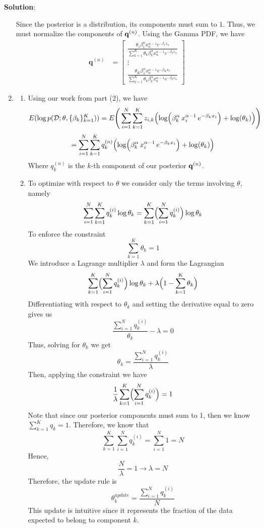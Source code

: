 \documentclass[submit]{../harvardml}
\newenvironment{solution}{
    \vspace{2mm}
    \color{blue}\noindent\textbf{Solution}:
}{}
\begin{document}
\begin{solution}
\begin{enumerate}
    Since the posterior is a distribution, its components must sum to $1$. Thus, we must normalize the components of $\bold q^{(n)}$. Using the Gamma PDF, we have
    \begin{align*}
      \textbf{q}^{(n)} &= \begin{bmatrix}
        \frac{\theta_1 \beta_1^{\alpha}x_n^{\alpha - 1} e^{-\beta_1 x_n}}{\sum_{k=1}^K \theta_k \beta_k^{\alpha}x_n^{\alpha - 1} e^{-\beta_k x_n}}  \\
        \vdots \\
        \frac{\theta_K \beta_1^{\alpha}x_n^{\alpha - 1} e^{-\beta_K x_n}}{\sum_{k=1}^K \theta_k \beta_k^{\alpha}x_n^{\alpha - 1} e^{-\beta_k x_n}}
      \end{bmatrix}
    \end{align*}

    \item
    \begin{enumerate}
        \item 
        Using our work from part (2), we have
        $$E(\log p(\mathcal D; \mathbf{\theta}, \{\beta_k\}^K_{k=1})) = E\Biggr(\sum_{i=1}^N \sum_{k=1}^K z_{i,k} \Bigl( \log\Bigl(\beta_k^{\alpha}\,x_i^{\alpha - 1}\,e^{-\beta_k x_i}\Bigr)+ \log(\theta_k)\Bigr)\Biggr)$$
        $$ = \sum_{i=1}^N \sum_{k=1}^K q^{(n)}_k \Bigl( \log\Bigl(\beta_k^{\alpha}\,x_i^{\alpha - 1}\,e^{-\beta_k x_i}\Bigr)+ \log(\theta_k)\Bigr)$$
        Where $q^{(n)}_k$ is the $k$-th component of our posterior $\bold q^{(n)}$. 
        \item
        To optimize with respect to $\theta$ we consider only the terms involving $\theta$, namely  $$\sum_{i=1}^N\sum_{k=1}^Kq^{(i)}_k\log\theta_k=\sum_{k=1}^K\Bigl(\sum_{i=1}^Nq^{(i)}_k\Bigr)\log\theta_k $$
        To enforce the constraint 
        $$ \sum_{k=1}^K\theta_k=1 $$
        We introduce a Lagrange multiplier $\lambda$ and form the Lagrangian
        $$\sum_{k=1}^K\Bigl(\sum_{i=1}^Nq^{(i)}_k\Bigr)\log\theta_k+\lambda\Bigl(1-\sum_{k=1}^K\theta_k\Bigr) $$
        Differentiating with respect to $\theta_k$ and setting the derivative equal to zero gives us 
        $$ \frac{\sum_{i=1}^Nq^{(i)}_k}{\theta_k}-\lambda=0 $$
        Thus, solving for $\theta_k$ we get 
        $$ \theta_k=\frac{\sum_{i=1}^Nq^{(i)}_k}{\lambda} $$
        Then, applying the constraint we have 
        $$ \frac{1}{\lambda}\sum_{k=1}^K\Bigl(\sum_{i=1}^Nq^{(i)}_k\Bigr)=1 $$
        Note that since our posterior components must sum to 1, then we know $\sum_{k=1}^K q_k = 1$. Therefore, we know that
        $$\sum_{k=1}^K\sum_{i=1}^Nq^{(i)}_k= \sum_{i=1}^N 1 = N$$
        Hence,
        $$\frac{N}{\lambda} = 1 \longrightarrow \lambda = N$$
        Therefore, the update rule is 
        $$\theta_k^{update}=\frac{\sum_{i=1}^Nq^{(i)}_k}{N}$$
        This update is intuitive since it represents the fraction of the data expected to belong to component $k$.


\end{enumerate}
\end{enumerate}
\end{solution}
\end{document}
